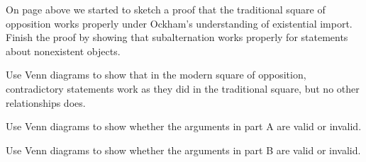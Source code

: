 
\problempart
\begin{exercises}\item On page \pageref{proving_trad_square} above we started to sketch a proof that the traditional square of opposition works properly under Ockham's understanding of existential import. Finish the proof by showing that subalternation works properly for statements about nonexistent objects.
\item Use Venn diagrams to show that in the modern square of opposition, contradictory statements work as they did in the traditional square, but no other relationships does.
\item Use Venn diagrams to show whether the arguments in part A are valid or invalid.
\item Use Venn diagrams to show whether the arguments in part B are valid or invalid.
\end{exercises}


